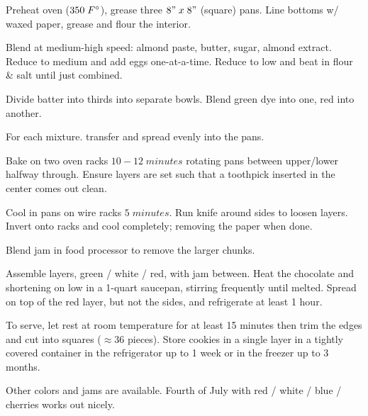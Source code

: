 \begin{preparation}
\item Preheat oven ($350\; F^\circ$), grease three $8"\;x\;8"$ (square) pans.
Line bottoms w/ waxed paper, grease and flour the interior.

\item Blend at medium-high speed: almond paste, butter, sugar, almond extract.
Reduce to medium and add eggs one-at-a-time.
Reduce to low and beat in flour \& salt until just combined.

\item Divide batter into thirds into separate bowls.
Blend green dye into one, red into another.

\item For each mixture. transfer and spread evenly into the pans.

\item Bake on two oven racks $10-12\; minutes$ rotating pans between upper/lower halfway through.
Ensure layers are set such that a toothpick inserted in the center comes out clean.

\item Cool in pans on wire racks $5\; minutes$.
Run knife around sides to loosen layers. Invert onto racks and cool completely; removing the paper when done.

\item Blend jam in food processor to remove the larger chunks.

\item Assemble layers, green / white / red, with jam between.
Heat the chocolate and shortening on low in a 1-quart saucepan, stirring frequently until melted.
Spread on top of the red layer, but not the sides, and refrigerate at least 1 hour.

\item To serve, let rest at room temperature for at least 15 minutes then trim the edges and cut into squares ($\approx36$ pieces).
Store cookies in a single layer in a tightly covered container in the refrigerator up to 1 week or in the freezer up to 3 months.
\end{preparation}

\begin{variation}
\item Other colors and jams are available. Fourth of July with red / white / blue / cherries works out nicely.
\end{variation}